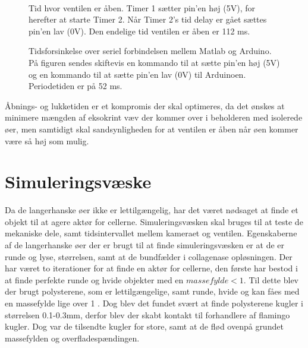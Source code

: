 \begin{figure}[H]
\begin{minipage}[b]{0.48\textwidth}
\end{minipage} \\ %
\begin{minipage}[t]{0.48\textwidth}
\caption{Tid hvor ventilen er åben. Timer 1 sætter pin'en høj (5V), for herefter at starte Timer 2. Når Timer 2's tid delay er gået sættes pin'en lav (0V). Den endelige tid ventilen er åben er 112 ms.} %
\label{fig:timerdelay}
\end{minipage} \hfill
\begin{minipage}[t]{0.48\textwidth}
\caption{Tidsforsinkelse over seriel forbindelsen mellem Matlab og Arduino. På figuren sendes skiftevis en kommando til at sætte pin'en høj (5V) og en kommando til at sætte pin'en lav (0V) til Arduinoen. Periodetiden er på 52 ms.} %
\label{fig:serielconn}
\end{minipage}
\end{figure}

 
Åbnings- og lukketiden er et kompromis der skal optimeres, da det ønskes at minimere mængden af eksokrint væv der kommer over i beholderen med isolerede øer, men samtidigt skal sandsynligheden for at ventilen er åben når øen kommer være så høj som mulig.



\section{Simuleringsvæske}
\label{sec:simuleringsv}
Da de langerhanske øer ikke er lettilgængelig, har det været nødsaget at finde et objekt til at agere aktør for cellerne. Simuleringsvæsken skal bruges til at teste de mekaniske dele, samt tidsintervallet mellem kameraet og ventilen. Egenskaberne af de langerhanske øer der er brugt til at finde simuleringsvæsken er at de er runde og lyse, størrelsen, samt at de bundfælder i collagenase opløsningen. Der har været to iterationer for at finde en aktør for cellerne, den første har bestod i at finde perfekte runde og hvide objekter med en $massefylde<1$. Til dette blev der brugt polysterene, som er lettilgængelige, samt runde, hvide og kan fåes med en massefylde lige over 1 \citep{polybog}. Dog blev det fundet svært at finde polysterene kugler i størrelsen 0.1-0.3mm, derfor blev der skabt kontakt til forhandlere af flamingo kugler. Dog var de tilsendte kugler for store, samt at de flød ovenpå grundet massefylden og overfladespændingen. 

